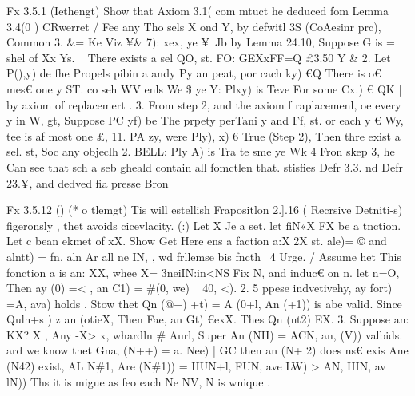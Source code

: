 \documentclass[a4paper,12pt]{article}
\begin{document}
    Fx 3.5.1 (Iethengt)  Show that Axiom 3.1( com mtuct he deduced fom Lemma 3.4(0  )    CRwerret  / Fee any Tho sels X ond Y, by defwitl 3S (CoAesinr prc), Common 3. \&=  Ke Viz ¥\& 7): xex, ye ¥\ Jb  by Lemma 24.10, Suppose G is = shel of Xx Ys. ~  There exists a sel QO, st. FO: GEXxFF=Q £3.50  Y  \&  2. Let P(),y) de fhe Propels pibin a andy Py an peat,    por cach ky) €Q There is o€ mes€ one y ST. co seh WV enls  We \$ ye Y: Plxy) is Teve For some Cx.) € QK | by axiom of replacemert .    3. From step 2, and the axiom f raplacemenl, oe every y in W,  gt, Suppose PC yf) be The prpety perTani y and Ff, st.  or each y € Wy, tee is af most one £, 11. PA zy, were Ply), x) 6 True (Step 2),  Then thre exist a sel. st, Soc any objeclh 2.    BELL: Ply A) is Tra te sme ye Wk    4 Fron skep 3, he Can see that sch a seb gheald contain all fomctlen  that. stisfies Defr 3.3. nd Defr 23.¥, and dedved fia presse Bron 

\vspace{10pt}

\par

\vspace{10pt}

    Fx 3.5.12 () (* o tlemgt)  Tis will estellish Frapositlon 2.].16 ( Recrsive Detniti-s) figeronsly , thet avoids cicevlacity.    (:) Let X Je a set. let fiN«X FX be a tnction.  Let c bean ekmet of xX.  Show Get Here ens a faction a:X 2X st. ale)= © and  alntt) = fn, aln\) Ar all ne IN, , wd frllemse bis fncth~ 4 Urge.    / Assume het This fonction a is an: XX, whee X= 3neiIN:in<NS  Fix N, and induc€ on n.  let n=O, Then ay (0) =< , an C1) = \#(0, we) ~ 40, <).    2. 5 ppese indvetivehy, ay fort) =A, ava) holds .  Stow thet Qn (@+) +t) = A (0+l, An (+1)) is abe valid.    Since Quln+s ) z an (otieX, Then Fae, an Gt) €exX.  Thes Qn (nt2) EX.    3. Suppose an: KX? X , Any -X> x, whardln \# Aurl,   Super An (NH) = ACN, an, (V)) valbids.   ard we know thet Gna, (N++) = a. Nee) |  GC then an (N+ 2) does ns€ exis  Ane (N42) exist, AL N\#1, Are (N\#1))  = HUN+l, FUN, ave LW)  > AN, HIN, av lN))  Ths it is migue as feo each Ne NV, N is wnique . 

\vspace{10pt}

\par

\vspace{10pt}
\end{document}
